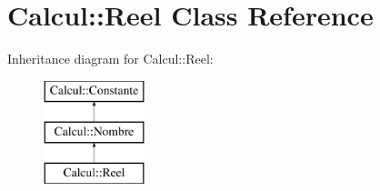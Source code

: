 \hypertarget{class_calcul_1_1_reel}{\section{Calcul\-:\-:Reel Class Reference}
\label{class_calcul_1_1_reel}
}
Inheritance diagram for Calcul\-:\-:Reel\-:\begin{figure}[H]
\begin{center}
\leavevmode
\includegraphics[height=3.000000cm]{class_calcul_1_1_reel}
\end{center}
\end{figure}
